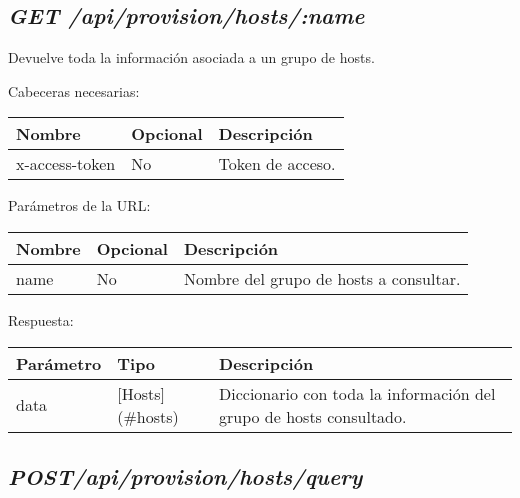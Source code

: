 \subsection{\textit{GET /api/provision/hosts/:name}}

Devuelve toda la información asociada a un grupo de hosts.

Cabeceras necesarias:

\begin{table}[h!]
	\centering
	\begin{adjustbox}{max width=\textwidth}
	\begin{tabular}{|l|l|l|}
		\hline
		Nombre & Opcional & Descripción \\ \hline
		x-access-token & No & Token de acceso. \\ \hline
	\end{tabular}
\end{adjustbox}
\end{table}

Parámetros de la URL:

\begin{table}[h!]
	\centering
	\begin{adjustbox}{max width=\textwidth}
	\begin{tabular}{|l|l|l|}
		\hline
		Nombre & Opcional & Descripción \\ \hline
		name & No & Nombre del grupo de hosts a consultar. \\ \hline
	\end{tabular}
\end{adjustbox}
\end{table}

Respuesta:

\begin{table}[h!]
	\centering
	\begin{adjustbox}{max width=\textwidth}
	\begin{tabular}{|l|l|l|}
		\hline
		Parámetro & Tipo & Descripción \\ \hline
		data & [Hosts](\#hosts) & Diccionario con toda la información del grupo de hosts consultado. \\ \hline
	\end{tabular}
\end{adjustbox}
\end{table}



\subsection{\textit{POST/api/provision/hosts/query}}

